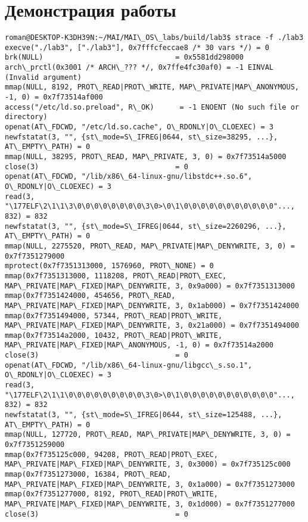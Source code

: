 \documentclass[a4paper, 12pt]{article}
\begin{document}
\section{Демонстрация работы}
\begin{lstlisting}
roman@DESKTOP-K3DH39N:~/MAI/MAI\_OS\_labs/build/lab3$ strace -f ./lab3
execve("./lab3", ["./lab3"], 0x7fffcfeccae8 /* 30 vars */) = 0
brk(NULL)                               = 0x5581dd298000
arch\_prctl(0x3001 /* ARCH\_??? */, 0x7ffe4fc30af0) = -1 EINVAL (Invalid argument)
mmap(NULL, 8192, PROT\_READ|PROT\_WRITE, MAP\_PRIVATE|MAP\_ANONYMOUS, -1, 0) = 0x7f73514af000
access("/etc/ld.so.preload", R\_OK)      = -1 ENOENT (No such file or directory)
openat(AT\_FDCWD, "/etc/ld.so.cache", O\_RDONLY|O\_CLOEXEC) = 3
newfstatat(3, "", {st\_mode=S\_IFREG|0644, st\_size=38295, ...}, AT\_EMPTY\_PATH) = 0
mmap(NULL, 38295, PROT\_READ, MAP\_PRIVATE, 3, 0) = 0x7f73514a5000
close(3)                                = 0
openat(AT\_FDCWD, "/lib/x86\_64-linux-gnu/libstdc++.so.6", O\_RDONLY|O\_CLOEXEC) = 3
read(3, "\177ELF\2\1\1\3\0\0\0\0\0\0\0\0\3\0>\0\1\0\0\0\0\0\0\0\0\0\0\0"..., 832) = 832
newfstatat(3, "", {st\_mode=S\_IFREG|0644, st\_size=2260296, ...}, AT\_EMPTY\_PATH) = 0
mmap(NULL, 2275520, PROT\_READ, MAP\_PRIVATE|MAP\_DENYWRITE, 3, 0) = 0x7f7351279000
mprotect(0x7f7351313000, 1576960, PROT\_NONE) = 0
mmap(0x7f7351313000, 1118208, PROT\_READ|PROT\_EXEC, MAP\_PRIVATE|MAP\_FIXED|MAP\_DENYWRITE, 3, 0x9a000) = 0x7f7351313000
mmap(0x7f7351424000, 454656, PROT\_READ, MAP\_PRIVATE|MAP\_FIXED|MAP\_DENYWRITE, 3, 0x1ab000) = 0x7f7351424000
mmap(0x7f7351494000, 57344, PROT\_READ|PROT\_WRITE, MAP\_PRIVATE|MAP\_FIXED|MAP\_DENYWRITE, 3, 0x21a000) = 0x7f7351494000
mmap(0x7f73514a2000, 10432, PROT\_READ|PROT\_WRITE, MAP\_PRIVATE|MAP\_FIXED|MAP\_ANONYMOUS, -1, 0) = 0x7f73514a2000
close(3)                                = 0
openat(AT\_FDCWD, "/lib/x86\_64-linux-gnu/libgcc\_s.so.1", O\_RDONLY|O\_CLOEXEC) = 3
read(3, "\177ELF\2\1\1\0\0\0\0\0\0\0\0\0\3\0>\0\1\0\0\0\0\0\0\0\0\0\0\0"..., 832) = 832
newfstatat(3, "", {st\_mode=S\_IFREG|0644, st\_size=125488, ...}, AT\_EMPTY\_PATH) = 0
mmap(NULL, 127720, PROT\_READ, MAP\_PRIVATE|MAP\_DENYWRITE, 3, 0) = 0x7f7351259000
mmap(0x7f735125c000, 94208, PROT\_READ|PROT\_EXEC, MAP\_PRIVATE|MAP\_FIXED|MAP\_DENYWRITE, 3, 0x3000) = 0x7f735125c000
mmap(0x7f7351273000, 16384, PROT\_READ, MAP\_PRIVATE|MAP\_FIXED|MAP\_DENYWRITE, 3, 0x1a000) = 0x7f7351273000
mmap(0x7f7351277000, 8192, PROT\_READ|PROT\_WRITE, MAP\_PRIVATE|MAP\_FIXED|MAP\_DENYWRITE, 3, 0x1d000) = 0x7f7351277000
close(3)                                = 0

\end{lstlisting}
\end{document}
